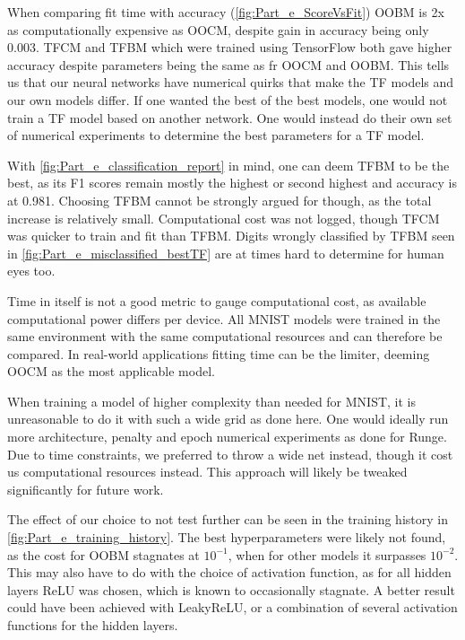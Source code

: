 \documentclass[reprint,english,notitlepage, floatfix]{revtex4-2}  %
\begin{document}
When comparing fit time with accuracy (\cref{fig:Part_e_ScoreVsFit}) OOBM is 2x as computationally expensive as OOCM, despite gain in accuracy being only 0.003. TFCM and TFBM which were trained using TensorFlow both gave higher accuracy despite parameters being the same as fr OOCM and OOBM. This tells us that our neural networks have numerical quirks that make the TF models and our own models differ. If one wanted the best of the best models, one would not train a TF model based on another network. One would instead do their own set of numerical experiments to determine the best parameters for a TF model. 

With \cref{fig:Part_e_classification_report} in mind, one can deem TFBM to be the best, as its F1 scores remain mostly the highest or second highest and accuracy is at 0.981. Choosing TFBM cannot be strongly argued for though, as the total increase is relatively small. Computational cost was not logged, though TFCM was quicker to train and fit than TFBM. Digits wrongly classified by TFBM seen in \cref{fig:Part_e_misclassified_bestTF} are at times hard to determine for human eyes too. 

Time in itself is not a good metric to gauge computational cost, as available computational power differs per device. All MNIST models were trained in the same environment with the same computational resources and can therefore be compared. In real-world applications fitting time can be the limiter, deeming OOCM as the most applicable model.

When training a model of higher complexity than needed for MNIST, it is unreasonable to do it with such a wide grid as done here. One would ideally run more architecture, penalty and epoch numerical experiments as done for Runge. Due to time constraints, we preferred to throw a wide net instead, though it cost us computational resources instead. This approach will likely be tweaked significantly for future work. 

The effect of our choice to not test further can be seen in the training history in \cref{fig:Part_e_training_history}. The best hyperparameters were likely not found, as the cost for OOBM stagnates at $10^{-1}$, when for other models it surpasses $10^{-2}$. This may also have to do with the choice of activation function, as for all hidden layers ReLU was chosen, which is known to occasionally stagnate. A better result could have been achieved with LeakyReLU, or a combination of several activation functions for the hidden layers. 
\end{document}
